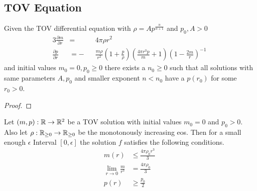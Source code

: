 \subsection{TOV Equation}
\label{subsec:5-Zeroes-TOV-Equ}
\begin{hypothesis}
	Given the TOV differential equation with $\rho=Ap^{\frac{n}{n+1}}$ and $p_0,A>0$
	\begin{alignat}{3}
		\frac{\partial m}{\partial r} &= &&4\pi\rho r^2\\
		\frac{\partial p}{\partial r} &= -&&\frac{m\rho}{r^2}\left(1+\frac{p}{\rho}\right)\left(\frac{4\pi r^3 p}{m}+1\right)\left(1-\frac{2m}{r}\right)^{-1}
		\label{5-Zeroes-Equ-TOV-Equ}
	\end{alignat}
	and initial values $m_0=0,p_0\geq0$ there exists a $n_0\geq0$ such that all solutions with same parameters $A,p_0$ and smaller exponent $n<n_0$ have a $p(r_0)$ for some $r_0>0$.
\end{hypothesis}
\begin{proof}
\end{proof}
\begin{lemma}
	\label{5-Zeroes-Lem-TOV-Conditions}
	Let $(m,p):\mathbb{R}\rightarrow\mathbb{R}^2$ be a \ac{TOV} solution with initial values $m_0=0$ and $p_0>0$.
	Also let $\rho:\mathbb{R}_{\geq0}\rightarrow\mathbb{R}_{\geq0}$ be the monotonously increasing \ac{eos}.
	Then for a small enough $\epsilon$ Interval $[0,\epsilon]$ the solution $f$ satisfies the following conditions.
	\begin{align}
		m(r) &\leq \frac{4\pi\rho_0 r^3}{3}\label{5-Zeroes-Equ-TOV-Conditions-1}\\
		\lim_{r\rightarrow0}\frac{m}{r^3}&=\frac{4\pi\rho_0}{3}\label{5-Zeroes-Equ-TOV-Conditions-2}\\
		p(r)&\geq\frac{p_0}{2}\label{5-Zeroes-Equ-TOV-Conditions-3}
	\end{align}
\end{lemma}
